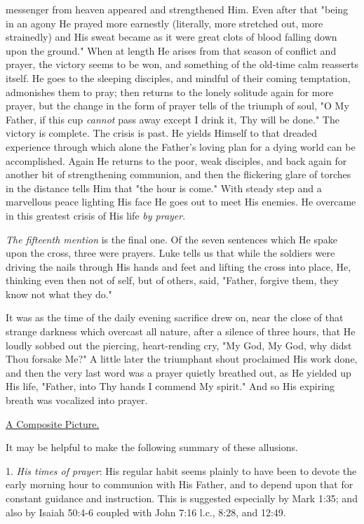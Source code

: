 messenger from heaven appeared and strengthened Him. Even after that
"being in an agony He prayed more earnestly (literally, more stretched
out, more strainedly) and His sweat became as it were great clots of blood
falling down upon the ground." When at length He arises from that season
of conflict and prayer, the victory seems to be won, and something of the
old-time calm reasserts itself. He goes to the sleeping disciples, and
mindful of their coming temptation, admonishes them to pray; then returns
to the lonely solitude again for more prayer, but the change in the form
of prayer tells of the triumph of soul, "O My Father, if this cup
\textit{cannot} pass away except I drink it, Thy will be done." The victory is
complete. The crisis is past. He yields Himself to that dreaded experience
through which alone the Father's loving plan for a dying world can be
accomplished. Again He returns to the poor, weak disciples, and back again
for another bit of strengthening communion, and then the flickering glare
of torches in the distance tells Him that "the hour is come." With steady
step and a marvellous peace lighting His face He goes out to meet His
enemies. He overcame in this greatest crisis of His life \textit{by prayer}.

\textit{The fifteenth mention} is the final one. Of the seven sentences which He
spake upon the cross, three were prayers. Luke tells us that while the
soldiers were driving the nails through His hands and feet and lifting the
cross into place, He, thinking even then not of self, but of others, said,
"Father, forgive them, they know not what they do."

It was as the time of the daily evening sacrifice drew on, near the close
of that strange darkness which overcast all nature, after a silence of
three hours, that He loudly sobbed out the piercing, heart-rending cry,
"My God, My God, why didst Thou forsake Me?" A little later the triumphant
shout proclaimed His work done, and then the very last word was a prayer
quietly breathed out, as He yielded up His life, "Father, into Thy hands
I commend My spirit." And so His expiring breath was vocalized into
prayer.



\underline{A Composite Picture.}


It may be helpful to make the following summary of these allusions.

1. \textit{His times of prayer}: His regular habit seems plainly to have been to
devote the early morning hour to communion with His Father, and to depend
upon that for constant guidance and instruction. This is suggested
especially by Mark 1:35; and also by Isaiah 50:4-6 coupled with John 7:16
l.c., 8:28, and 12:49.

